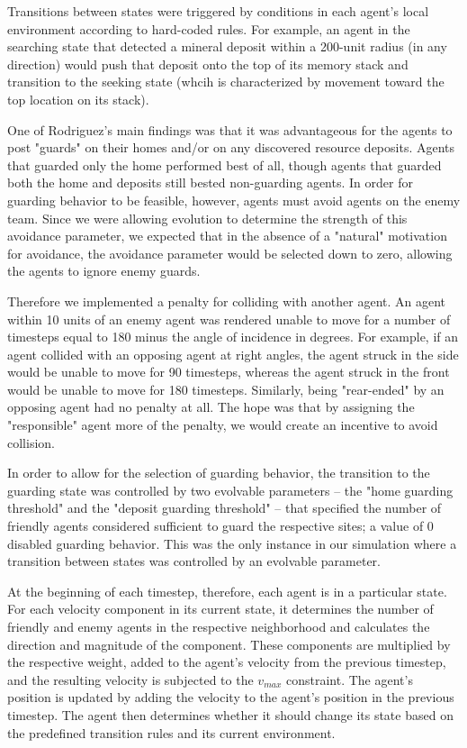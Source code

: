 \documentclass[12pt,journal,compsoc]{IEEEtran}
\begin{document}
Transitions between states were triggered by conditions in each agent's local environment according to hard-coded rules. For example, an agent in the searching state that detected a mineral deposit within a 200-unit radius (in any direction) would push that deposit onto the top of its memory stack and transition to the seeking state (whcih is characterized by movement toward the top location on its stack).

One of Rodriguez's main findings was that it was advantageous for the agents to post "guards" on their homes and/or on any discovered resource deposits. Agents that guarded only the home performed best of all, though agents that guarded both the home and deposits still bested non-guarding agents. In order for guarding behavior to be feasible, however, agents must avoid agents on the enemy team. Since we were allowing evolution to determine the strength of this avoidance parameter, we expected that in the absence of a "natural" motivation for avoidance, the avoidance parameter would be selected down to zero, allowing the agents to ignore enemy guards.

Therefore we implemented a penalty for colliding with another agent. An agent within 10 units of an enemy agent was rendered unable to move for a number of timesteps equal to 180 minus the angle of incidence in degrees. For example, if an agent collided with an opposing agent at right angles, the agent struck in the side would be unable to move for 90 timesteps, whereas the agent struck in the front would be unable to move for 180 timesteps. Similarly, being "rear-ended" by an opposing agent had no penalty at all. The hope was that by assigning the "responsible" agent more of the penalty, we would create an incentive to avoid collision.

In order to allow for the selection of guarding behavior, the transition to the guarding state was controlled by two  evolvable parameters -- the "home guarding threshold" and the "deposit guarding threshold" -- that specified the number of friendly agents considered sufficient to guard the respective sites; a value of 0 disabled guarding behavior. This was the only instance in our simulation where a transition between states was controlled by an evolvable parameter.

At the beginning of each timestep, therefore, each agent is in a particular state. For each velocity component in its current state, it determines the number of friendly and enemy agents in the respective neighborhood and calculates the direction and magnitude of the component. These components are multiplied by the respective weight, added to the agent's velocity from the previous timestep, and the resulting velocity is subjected to the $v_{max}$ constraint. The agent's position is updated by adding the velocity to the agent's position in the previous timestep. The agent then determines whether it should change its state based on the predefined transition rules and its current environment.
\end{document}
